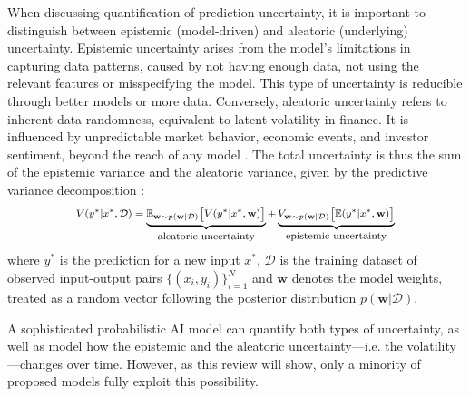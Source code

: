 When discussing quantification of prediction uncertainty, it is important to distinguish between epistemic (model-driven) and aleatoric (underlying) uncertainty. Epistemic uncertainty arises from the model's limitations in capturing data patterns, caused by not having enough data, not using the relevant features or misspecifying the model. This type of uncertainty is reducible through better models or more data. Conversely, aleatoric uncertainty refers to inherent data randomness, equivalent to latent volatility in finance. It is influenced by unpredictable market behavior, economic events, and investor sentiment, beyond the reach of any model \parencite[7,34]{pml1Book, KIUREGHIAN2009105, hullermeier2021aleatoric}. The total uncertainty is thus the sum of the epistemic variance and the aleatoric variance, given by the predictive variance decomposition \parencite{depeweg2018uncertainty_decomposition}:
\begin{equation}
    \begin{footnotesize}
    \begin{gathered} 
    V(y^*|x^*,\mathcal{D})=
    \underbrace{\mathbb{E}_{\mathbf{w}\sim p(\mathbf{w}|\mathcal{D})}\big[V(y^*| x^*,\mathbf{w})\big]}_{\displaystyle\text{aleatoric uncertainty}}+
    \underbrace{V_{\mathbf{w}\sim p(\mathbf{w}|\mathcal{D})}\big[\mathbb{E}(y^*| x^*,\mathbf{w})\big]}_{\displaystyle\text{epistemic uncertainty}}
    \end{gathered}
    \end{footnotesize}
\end{equation}
where $y^*$ is the prediction for a new input $x^*$, $\mathcal{D}$ is the training dataset of observed input-output pairs $\{(x_i,y_i)\}^{N}_{i=1}$ and $\mathbf{w}$ denotes the model weights, treated as a random vector following the posterior distribution $p(\mathbf{w}|\mathcal{D})$.

A sophisticated probabilistic AI model can quantify both types of uncertainty, as well as model how the epistemic and the aleatoric uncertainty—i.e. the volatility—changes over time. However, as this review will show, only a minority of proposed models fully exploit this possibility.

